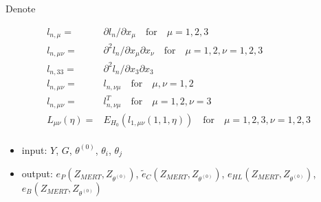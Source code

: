 \documentclass{article}
\begin{document}
Denote 

\begin{align*}
  l_{n,\mu} =& \partial l_n/\partial x_\mu \quad \text{for} \quad \mu= 1,2,3 \\
  l_{n,\mu\nu}= & \partial^2 l_n/\partial x_\mu \partial x_\nu \quad \text{for} \quad \mu=1,2, \nu= 1,2,3\\
  l_{n,33}= & \partial^2 l_n/\partial x_3 \partial x_3\\
  l_{n,\mu\nu} = & l_{n,\nu\mu} \quad \text{for} \quad \mu,\nu = 1,2\\
  l_{n,\mu\nu} = & l^T_{n,\nu\mu} \quad \text{for} \quad \mu= 1,2, \nu=3\\
  L_{\mu\nu}(\eta) =& E_{H_0}(l_{1,\mu\nu}(1,1,\eta))\quad \text{for} \quad \mu=1,2,3, \nu= 1,2,3\\
\end{align*}



\begin{itemize}
\item input: $Y$, $G$, $\theta^{(0)}$, $\theta_i$, $\theta_j$
\item output: $e_P(Z_{MERT},Z_{\theta^{(0)}})$, $\tilde{e}_C(Z_{MERT},Z_{\theta^{(0)}})$, $e_{HL}(Z_{MERT},Z_{\theta^{(0)}})$, $e_{B}(Z_{MERT},Z_{\theta^{(0)}})$
\end{itemize}
\end{document}
